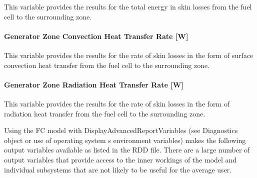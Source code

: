 This variable provides the results for the total energy in skin losses from the fuel cell to the surrounding zone.

\paragraph{Generator Zone Convection Heat Transfer Rate {[}W{]}}\label{generator-zone-convection-heat-transfer-rate-w-1}

This variable provides the results for the rate of skin losses in the form of surface convection heat transfer from the fuel cell to the surrounding zone.

\paragraph{Generator Zone Radiation Heat Transfer Rate {[}W{]}}\label{generator-zone-radiation-heat-transfer-rate-w-1}

This variable provides the results for the rate of skin losses in the form of radiation heat transfer from the fuel cell to the surrounding zone.

Using the FC model with DisplayAdvancedReportVariables (see Diagnostics object or use of operating system s environment variables) makes the following output variables available as listed in the RDD file. There are a large number of output variables that provide access to the inner workings of the model and individual subsystems that are not likely to be useful for the average user.

